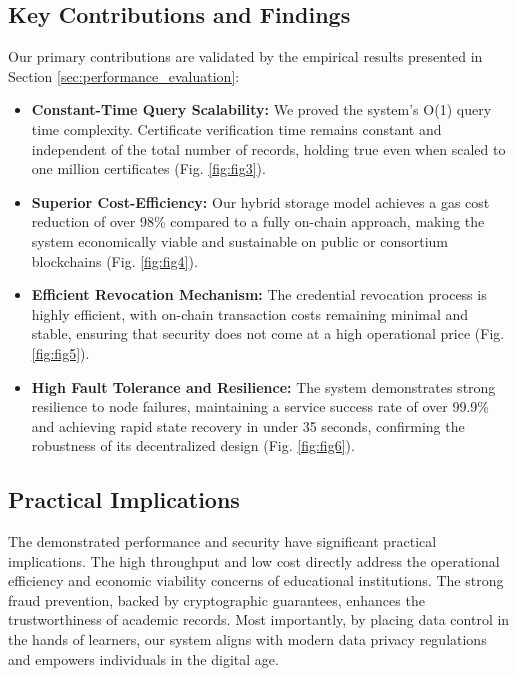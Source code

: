 \documentclass[lettersize,journal]{IEEEtran}
\begin{document}
\begin{itemize}
\subsection{Key Contributions and Findings}
Our primary contributions are validated by the empirical results presented in Section \ref{sec:performance_evaluation}:
\begin{itemize}
{{ ... }}

    \item \textbf{Constant-Time Query Scalability:} We proved the system's O(1) query time complexity. Certificate verification time remains constant and independent of the total number of records, holding true even when scaled to one million certificates (Fig. \ref{fig:fig3}).

    \item \textbf{Superior Cost-Efficiency:} Our hybrid storage model achieves a gas cost reduction of over 98\% compared to a fully on-chain approach, making the system economically viable and sustainable on public or consortium blockchains (Fig. \ref{fig:fig4}).

    \item \textbf{Efficient Revocation Mechanism:} The credential revocation process is highly efficient, with on-chain transaction costs remaining minimal and stable, ensuring that security does not come at a high operational price (Fig. \ref{fig:fig5}).

    \item \textbf{High Fault Tolerance and Resilience:} The system demonstrates strong resilience to node failures, maintaining a service success rate of over 99.9\% and achieving rapid state recovery in under 35 seconds, confirming the robustness of its decentralized design (Fig. \ref{fig:fig6}).
\end{itemize}

\subsection{Practical Implications}
The demonstrated performance and security have significant practical implications. The high throughput and low cost directly address the operational efficiency and economic viability concerns of educational institutions. The strong fraud prevention, backed by cryptographic guarantees, enhances the trustworthiness of academic records. Most importantly, by placing data control in the hands of learners, our system aligns with modern data privacy regulations and empowers individuals in the digital age.


\end{itemize}
\end{document}
